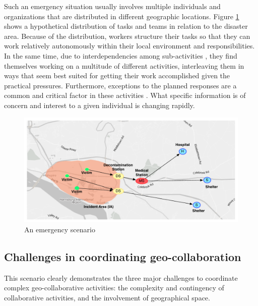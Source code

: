 Such an emergency situation usually involves multiple individuals and organizations that are distributed in different geographic locations. Figure \ref{fig:scenario_overview} shows a hypothetical distribution of tasks and teams in relation to the disaster area. Because of the distribution, workers structure their tasks so that they can work relatively autonomously within their local environment and responsibilities. In the same time, due to interdependencies among sub-activities \cite{shen2004managing}, they find themselves working on a multitude of different activities, interleaving them in ways that seem best suited for getting their work accomplished given the practical pressures. Furthermore, exceptions to the planned responses are a common and critical factor in these activities \cite{yao2006design}. What specific information is of concern and interest to a given individual is changing rapidly.

\begin{figure}[htbp] %
   \centering
   \includegraphics[width=5.8in]{scenario.pdf} 
   \caption{An emergency scenario}
   \label{fig:scenario_overview}
\end{figure}





\subsection{Challenges in coordinating geo-collaboration} %
\label{sub:challenges_in_coordination}
This scenario clearly demonstrates the three major challenges to coordinate complex geo-collaborative activities: the complexity and contingency of collaborative activities, and the involvement of geographical space.

